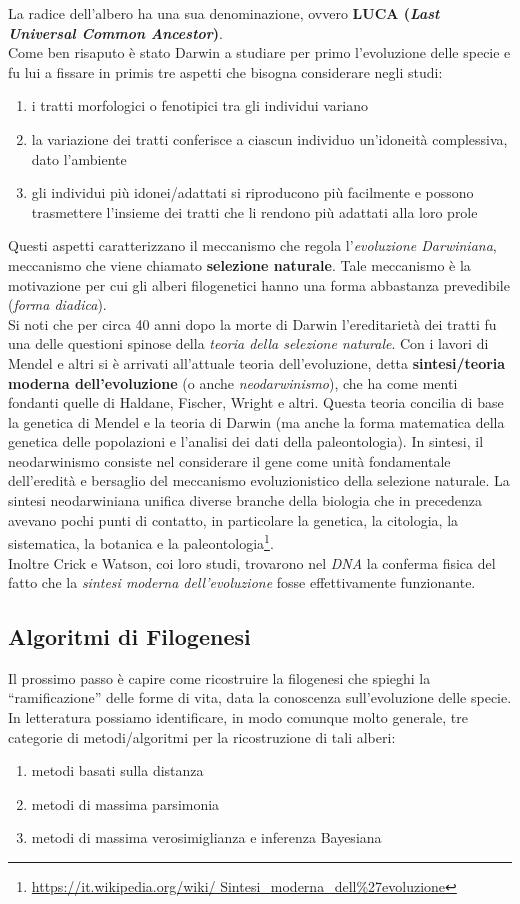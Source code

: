 \documentclass[a4paper,12pt, oneside]{book}
\begin{document}
La radice dell'albero ha una sua denominazione, ovvero \textbf{LUCA
  (\textit{Last Universal Common Ancestor})}.\\
Come ben risaputo è stato Darwin a studiare per primo l'evoluzione delle specie
e fu lui a fissare in primis tre aspetti che bisogna considerare negli studi:
\begin{enumerate}
  \item i tratti morfologici o fenotipici tra gli individui variano
  \item la variazione dei tratti conferisce a ciascun individuo un'idoneità
  complessiva, dato l'ambiente
  \item gli individui più idonei/adattati  si riproducono più facilmente e
  possono trasmettere l'insieme dei tratti che li rendono più adattati alla loro
  prole
\end{enumerate}
Questi aspetti caratterizzano il meccanismo che regola l'\textit{evoluzione
  Darwiniana}, meccanismo che viene chiamato \textbf{selezione naturale}. Tale
meccanismo è la motivazione per cui gli alberi filogenetici hanno una forma
abbastanza prevedibile (\textit{forma diadica}). \\
Si noti che per circa 40 anni dopo la morte di Darwin l'ereditarietà dei tratti
fu una delle questioni spinose della \textit{teoria della selezione
  naturale}. Con i lavori di Mendel e altri si è arrivati all'attuale teoria
dell'evoluzione, detta \textbf{sintesi/teoria moderna dell'evoluzione} (o anche
\textit{neodarwinismo}), che ha come menti fondanti quelle di Haldane, Fischer,
Wright e altri. Questa teoria concilia di base la genetica di Mendel e la teoria
di Darwin (ma anche la forma matematica della genetica delle popolazioni e
l'analisi dei dati della paleontologia). In sintesi, il neodarwinismo consiste
nel considerare il gene come unità fondamentale dell'eredità e bersaglio del
meccanismo evoluzionistico della selezione naturale. La sintesi neodarwiniana
unifica diverse branche della biologia che in precedenza avevano pochi punti di
contatto, in particolare la genetica, la citologia, la sistematica, la botanica
e la
paleontologia\footnote{\url{https://it.wikipedia.org/wiki/
    Sintesi_moderna_dell\%27evoluzione}}.\\
Inoltre Crick e Watson, coi loro studi, trovarono nel \textit{DNA} la conferma
fisica del fatto che la \textit{sintesi moderna dell'evoluzione} fosse
effettivamente funzionante.
\subsection{Algoritmi di Filogenesi}
Il prossimo passo è capire come ricostruire la filogenesi che spieghi la
``ramificazione'' delle forme di vita, data la conoscenza sull'evoluzione delle
specie. \\
In letteratura possiamo identificare, in modo comunque molto generale, tre
categorie di metodi/algoritmi per la ricostruzione di tali alberi:
\begin{enumerate}
  \item metodi basati sulla distanza
  \item metodi di massima parsimonia
  \item metodi di massima verosimiglianza e inferenza Bayesiana
\end{enumerate}
\end{document}
